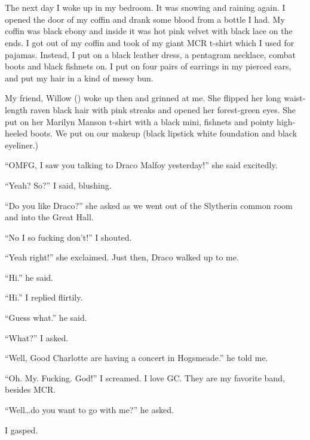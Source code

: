 \section{}



The next day I woke up in my bedroom. It was snowing and raining again. I opened the door of my coffin and drank some blood from a bottle I had. My coffin was black ebony and inside it was hot pink velvet with black lace on the ends. I got out of my coffin and took of my giant MCR t-shirt which I used for pajamas. Instead, I put on a black leather dress, a pentagram necklace, combat boots and black fishnets on. I put on four pairs of earrings in my pierced ears, and put my hair in a kind of messy bun.

My friend, Willow () woke up then and grinned at me. She flipped her long waist-length raven black hair with pink streaks and opened her forest-green eyes. She put on her Marilyn Manson t-shirt with a black mini, fishnets and pointy high-heeled boots. We put on our makeup (black lipstick white foundation and black eyeliner.)

\enquote{OMFG, I saw you talking to Draco Malfoy yesterday!} she said excitedly.

\enquote{Yeah? So?} I said, blushing.

\enquote{Do you like Draco?} she asked as we went out of the Slytherin common room and into the Great Hall.

\enquote{No I so fucking don't!} I shouted.

\enquote{Yeah right!} she exclaimed. Just then, Draco walked up to me.

\enquote{Hi.} he said.

\enquote{Hi.} I replied flirtily.

\enquote{Guess what.} he said.

\enquote{What?} I asked.

\enquote{Well, Good Charlotte are having a concert in Hogsmeade.} he told me.

\enquote{Oh. My. Fucking. God!} I screamed. I love GC\@. They are my favorite band, besides MCR\@.

\enquote{Well\ldots do you want to go with me?} he asked.

I gasped.
